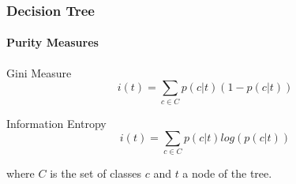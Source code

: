 \begin{frame}
	\frametitle{Decision Tree}
	\framesubtitle{Purity Measures}
	\begin{block}{Gini Measure}
		\begin{equation*}    
			i(t) = \sum_{c \in C} p(c|t) (1 - p(c|t))
		\end{equation*}
	\end{block}
	\begin{block}{Information Entropy}
		\begin{equation*}    
			i(t) = \sum_{c \in C} p(c|t) log(p(c|t))
		\end{equation*}
	\end{block}	
	\bigbreak
	where $C$ is the set of classes $c$ and $t$ a node of the tree.
\end{frame}
